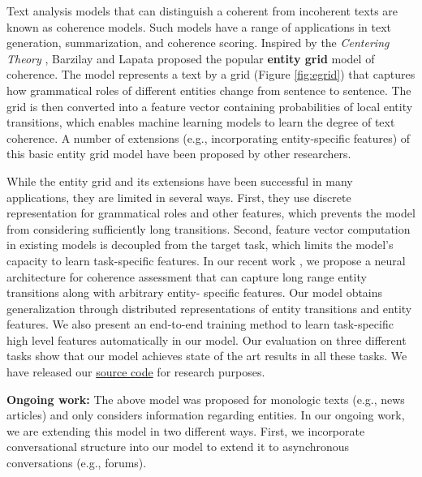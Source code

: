 \documentclass{article} %
\begin{document}
Text analysis models that can distinguish a coherent from incoherent texts are known as coherence models. Such models have a range of applications in text generation, summarization, and coherence scoring. Inspired by the \emph{Centering Theory} \cite{Grosz_95}, Barzilay and Lapata \cite{} proposed the popular \textbf{entity grid} model of coherence. The model represents a text by a grid (Figure \ref{fig:egrid}) that captures how grammatical roles of different entities change from sentence to sentence. The grid is then converted into a feature vector containing probabilities of local entity transitions, which enables machine learning models to learn the degree of text coherence. A number of extensions (e.g., incorporating entity-specific features) of this basic entity grid model have been proposed by other researchers.  




While the entity grid and its extensions have been successful in many applications, they are limited in several ways. First, they use discrete representation for grammatical roles and other features, which prevents the model from considering sufficiently long transitions. Second, feature vector computation in existing models is decoupled from the target task, which limits the model’s capacity to learn task-specific features. In our recent work \cite{}, we propose a neural architecture for coherence assessment that can capture long range entity transitions along with arbitrary entity- specific features. Our model obtains generalization through distributed representations of entity transitions and entity features. We also present an end-to-end training method to learn task-specific high level features automatically in our model. Our evaluation on three different tasks show that  our model achieves state of the art results in all these tasks. We have released our \href{https://github.com/datienguyen/cnn_ coherence/}{source code} for research purposes.


\textbf{Ongoing work:} The above model was proposed for monologic texts (e.g., news articles) and only considers information regarding entities. In our ongoing work, we are extending this model in two different ways. First, we incorporate conversational structure into our model to extend it to asynchronous conversations (e.g., forums). %


\end{document}
